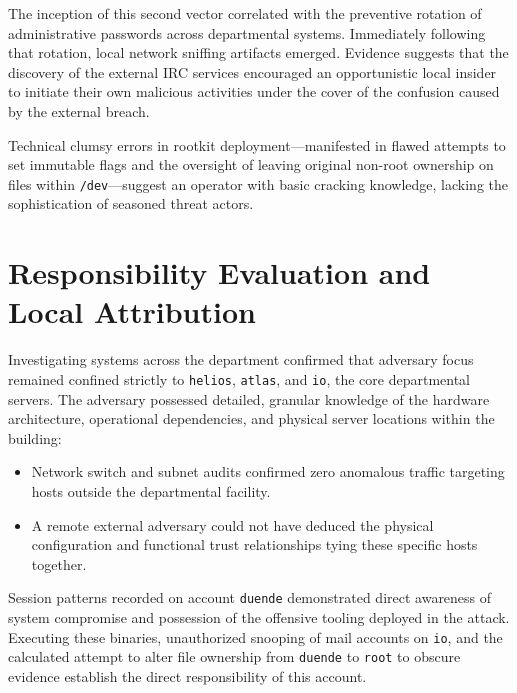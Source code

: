The inception of this second vector correlated with the preventive rotation of administrative passwords across departmental systems. Immediately following that rotation, local network sniffing artifacts emerged. Evidence suggests that the discovery of the external IRC services encouraged an opportunistic local insider to initiate their own malicious activities under the cover of the confusion caused by the external breach.

Technical clumsy errors in rootkit deployment---manifested in flawed attempts to set immutable flags and the oversight of leaving original non-root ownership on files within \texttt{/dev}---suggest an operator with basic cracking knowledge, lacking the sophistication of seasoned threat actors.

\section{Responsibility Evaluation and Local Attribution}

Investigating systems across the department confirmed that adversary focus remained confined strictly to \texttt{helios}, \texttt{atlas}, and \texttt{io}, the core departmental servers. The adversary possessed detailed, granular knowledge of the hardware architecture, operational dependencies, and physical server locations within the building:
\begin{itemize}
    \item Network switch and subnet audits confirmed zero anomalous traffic targeting hosts outside the departmental facility.
    \item A remote external adversary could not have deduced the physical configuration and functional trust relationships tying these specific hosts together.
\end{itemize}

Session patterns recorded on account \texttt{duende} demonstrated direct awareness of system compromise and possession of the offensive tooling deployed in the attack. Executing these binaries, unauthorized snooping of mail accounts on \texttt{io}, and the calculated attempt to alter file ownership from \texttt{duende} to \texttt{root} to obscure evidence establish the direct responsibility of this account.

